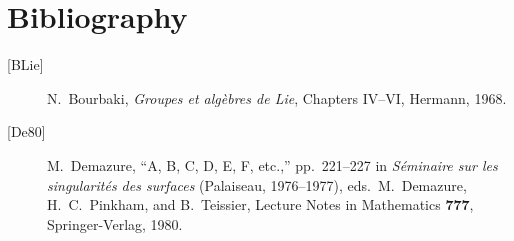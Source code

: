 \section*{Bibliography}
\label{sga3:XXI:bibliography}

\begin{description}
\item[{[BLie]}] N.~Bourbaki,
  \emph{Groupes et algèbres de Lie}, Chapters IV--VI,
  Hermann, 1968.
\item[{[De80]}] M.~Demazure,
  ``A, B, C, D, E, F, etc.,'' pp.~221--227 in
  \emph{Séminaire sur les singularités des surfaces}
  (Palaiseau, 1976--1977), eds.\ M.~Demazure,
  H.~C.~Pinkham, and B.~Teissier,
  Lecture Notes in Mathematics \textbf{777},
  Springer-Verlag, 1980.
\end{description}




